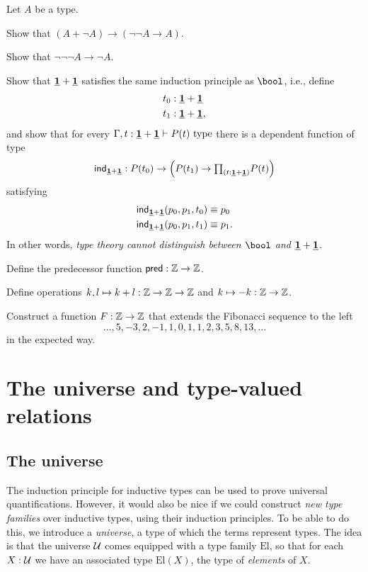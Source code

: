 \begin{exercises}
\item Let $A$ be a type.
  \begin{subexenum}
  \item Show that $(A+\neg A)\to(\neg\neg A\to A)$.
  \item Show that $\neg\neg\neg A \to \neg A$.
  \end{subexenum}
\item \label{ex:one_plus_one} Show that $\underline{\mathbf{1}}+\underline{\mathbf{1}}$ satisfies the same induction principle as $\bool$, i.e., define
\begin{align*}
t_0 & : \underline{\mathbf{1}} + \underline{\mathbf{1}} \\
t_1 & : \underline{\mathbf{1}} + \underline{\mathbf{1}},
\end{align*}
and show that for every $\Gamma,t:\underline{\mathbf{1}}+\underline{\mathbf{1}}\vdash P(t)~\mathrm{type}$ there is a dependent function of type
\begin{align*}
\ind{\unit+\unit}:P(t_0)\to \Big(P(t_1)\to \prd{t:\unit+\unit}P(t)\Big)
\end{align*}
satisfying
\begin{align*}
\mathsf{ind}_{\underline{\mathbf{1}}+\underline{\mathbf{1}}}(p_0,p_1,t_0) & \equiv p_0 \\
\mathsf{ind}_{\underline{\mathbf{1}}+\underline{\mathbf{1}}}(p_0,p_1,t_1) & \equiv p_1.
\end{align*}
In other words, \emph{type theory cannot distinguish between $\bool$ and $\underline{\mathbf{1}}+\underline{\mathbf{1}}$.}
\item \label{ex:int_pred}Define the predecessor function $\mathsf{pred}:\mathbb{Z}\to \mathbb{Z}$.
\item \label{ex:int_group_ops}Define operations $k,l\mapsto k+l:\mathbb{Z}\to\mathbb{Z}\to\mathbb{Z}$ and $k\mapsto -k:\mathbb{Z}\to \mathbb{Z}$.
\item Construct a function $F:\mathbb{Z}\to\mathbb{Z}$ that extends the Fibonacci sequence to the left
  \begin{equation*}
    \ldots,5,-3,2,-1,1,0,1,1,2,3,5,8,13,\ldots
  \end{equation*}
  in the expected way.
\end{exercises}

\chapter{The universe and type-valued relations}

\section{The universe}
The induction principle for inductive types can be used to prove universal quantifications. 
However, it would also be nice if we could construct \emph{new type families} over inductive types, using their induction principles.
To be able to do this, we introduce a \emph{universe}, a type of which the terms represent types. The idea is that the universe $\mathcal{U}$ comes equipped with a type family $\mathrm{El}$, so that for each $X:\mathcal{U}$ we have an associated type $\mathrm{El}(X)$, the type of \emph{elements} of $X$. 

